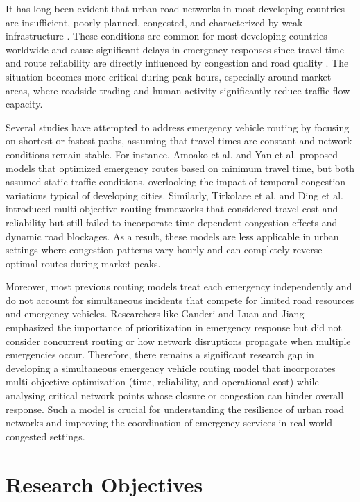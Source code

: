 \documentclass[paper=A4, 12pt, mathscr]{report}
\begin{document}
	It has long been evident that urban road networks in most developing countries are insufficient, poorly planned, congested, and characterized by weak infrastructure  \cite{dumas2025, gonzalez2023}. These conditions are common for most developing countries worldwide and cause significant delays in emergency responses since travel time and route reliability are directly influenced by congestion and road quality \cite{9}. The situation becomes more critical during peak hours, especially around market areas, where roadside trading and human activity significantly reduce traffic flow capacity.
	
	Several studies have attempted to address emergency vehicle routing by focusing on shortest or fastest paths, assuming that travel times are constant and network conditions remain stable. For instance,  Amoako et al. \cite{10} and Yan et al. \cite{yan2021} proposed models that optimized emergency routes based on minimum travel time, but both assumed static traffic conditions, overlooking the impact of temporal congestion variations typical of developing cities. Similarly, Tirkolaee et al. \cite{tirkolaee2020} and Ding et al.\cite{ding2021} introduced multi-objective routing frameworks that considered travel cost and reliability but still failed to incorporate time-dependent congestion effects and dynamic road blockages. As a result, these models are less applicable in urban settings where congestion patterns vary hourly and can completely reverse optimal routes during market peaks.
	
	Moreover, most previous routing models treat each emergency independently and do not account for simultaneous incidents that compete for limited road resources and emergency vehicles. Researchers like Ganderi \cite{7} and Luan and Jiang \cite{luan2024} emphasized the importance of prioritization in emergency response but did not consider concurrent routing or how network disruptions propagate when multiple emergencies occur. Therefore, there remains a significant research gap in developing a simultaneous emergency vehicle routing model that incorporates multi-objective optimization (time, reliability, and operational cost) while analysing critical network points whose closure or congestion can hinder overall response. Such a model is crucial for understanding the resilience of urban road networks and improving the coordination of emergency services in real-world congested settings.
	
	\section{Research Objectives}
\end{document}
